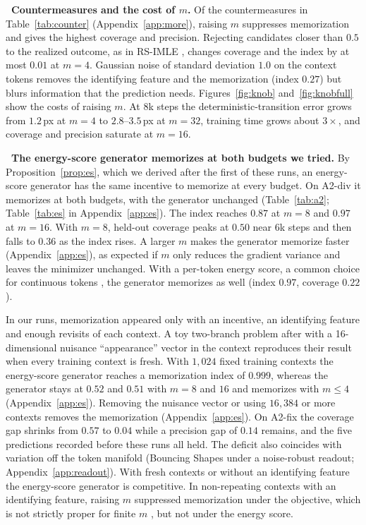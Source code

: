 \leavevmode{}\textbf{\thesubsection\ Countermeasures and the cost of $m$.}
\label{sec:counter}
Of the countermeasures in Table~\ref{tab:counter} (Appendix~\ref{app:more}), raising $m$ suppresses memorization and gives the highest coverage and precision. Rejecting candidates closer than $0.5$ to the realized outcome, as in RS-IMLE \citep{vashist2024rsimle}, changes coverage and the index by at most $0.01$ at $m{=}4$. Gaussian noise of standard deviation $1.0$ on the context tokens removes the identifying feature and the memorization (index $0.27$) but blurs information that the prediction needs. Figures~\ref{fig:knob} and~\ref{fig:knobfull} show the costs of raising $m$. At 8k steps the deterministic-transition error grows from $1.2$\,px at $m{=}4$ to $2.8$--$3.5$\,px at $m{=}32$, training time grows about $3\times$, and coverage and precision saturate at $m{=}16$.

\leavevmode{}\textbf{\thesubsection\ The energy-score generator memorizes at both budgets we tried.}
\label{sec:es}
By Proposition~\ref{prop:es}, which we derived after the first of these runs, an energy-score generator has the same incentive to memorize at every budget. On A2-div it memorizes at both budgets, with the \imlewm{} generator unchanged (Table~\ref{tab:a2}; Table~\ref{tab:es} in Appendix~\ref{app:es}). The index reaches $0.87$ at $m{=}8$ and $0.97$ at $m{=}16$. With $m{=}8$, held-out coverage peaks at $0.50$ near 6k steps and then falls to $0.36$ as the index rises. A larger $m$ makes the generator memorize faster (Appendix~\ref{app:es}), as expected if $m$ only reduces the gradient variance and leaves the minimizer unchanged. With a per-token energy score, a common choice for continuous tokens \citep{shao2025continuous}, the generator memorizes as well (index $0.97$, coverage $0.22$).


In our runs, memorization appeared only with an incentive, an identifying feature and enough revisits of each context. A toy two-branch problem after \citet{makabe2026esp} with a 16-dimensional nuisance ``appearance'' vector in the context reproduces their result when every training context is fresh. With $1{,}024$ fixed training contexts the energy-score generator reaches a memorization index of $0.999$, whereas the \nom{} generator stays at $0.52$ and $0.51$ with $m = 8$ and $16$ and memorizes with $m \le 4$ (Appendix~\ref{app:es}). Removing the nuisance vector or using $16{,}384$ or more contexts removes the memorization (Appendix~\ref{app:es}). On A2-fix the coverage gap shrinks from $0.57$ to $0.04$ while a precision gap of $0.14$ remains, and the five predictions recorded before these runs all held. The deficit also coincides with variation off the token manifold (Bouncing Shapes under a noise-robust readout; Appendix~\ref{app:readout}). With fresh contexts or without an identifying feature the energy-score generator is competitive. In non-repeating contexts with an identifying feature, raising $m$ suppressed memorization under the \nom{} objective, which is not strictly proper for finite $m$ \citep{makabe2026esp}, but not under the energy score.
